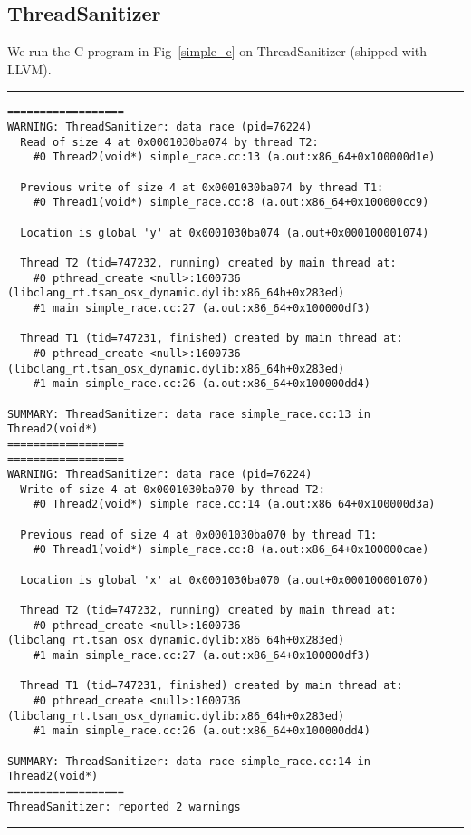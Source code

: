 \subsection{ThreadSanitizer}

We run the C program in Fig~\ref{simple_c} on ThreadSanitizer (shipped with LLVM).

\vspace{0.5cm}
\hrule
{\small
\begin{verbatim}
==================
WARNING: ThreadSanitizer: data race (pid=76224)
  Read of size 4 at 0x0001030ba074 by thread T2:
    #0 Thread2(void*) simple_race.cc:13 (a.out:x86_64+0x100000d1e)

  Previous write of size 4 at 0x0001030ba074 by thread T1:
    #0 Thread1(void*) simple_race.cc:8 (a.out:x86_64+0x100000cc9)

  Location is global 'y' at 0x0001030ba074 (a.out+0x000100001074)

  Thread T2 (tid=747232, running) created by main thread at:
    #0 pthread_create <null>:1600736 (libclang_rt.tsan_osx_dynamic.dylib:x86_64h+0x283ed)
    #1 main simple_race.cc:27 (a.out:x86_64+0x100000df3)

  Thread T1 (tid=747231, finished) created by main thread at:
    #0 pthread_create <null>:1600736 (libclang_rt.tsan_osx_dynamic.dylib:x86_64h+0x283ed)
    #1 main simple_race.cc:26 (a.out:x86_64+0x100000dd4)

SUMMARY: ThreadSanitizer: data race simple_race.cc:13 in Thread2(void*)
==================
==================
WARNING: ThreadSanitizer: data race (pid=76224)
  Write of size 4 at 0x0001030ba070 by thread T2:
    #0 Thread2(void*) simple_race.cc:14 (a.out:x86_64+0x100000d3a)

  Previous read of size 4 at 0x0001030ba070 by thread T1:
    #0 Thread1(void*) simple_race.cc:8 (a.out:x86_64+0x100000cae)

  Location is global 'x' at 0x0001030ba070 (a.out+0x000100001070)

  Thread T2 (tid=747232, running) created by main thread at:
    #0 pthread_create <null>:1600736 (libclang_rt.tsan_osx_dynamic.dylib:x86_64h+0x283ed)
    #1 main simple_race.cc:27 (a.out:x86_64+0x100000df3)

  Thread T1 (tid=747231, finished) created by main thread at:
    #0 pthread_create <null>:1600736 (libclang_rt.tsan_osx_dynamic.dylib:x86_64h+0x283ed)
    #1 main simple_race.cc:26 (a.out:x86_64+0x100000dd4)

SUMMARY: ThreadSanitizer: data race simple_race.cc:14 in Thread2(void*)
==================
ThreadSanitizer: reported 2 warnings
\end{verbatim}
}
\hrule
\vspace{0.5cm}

